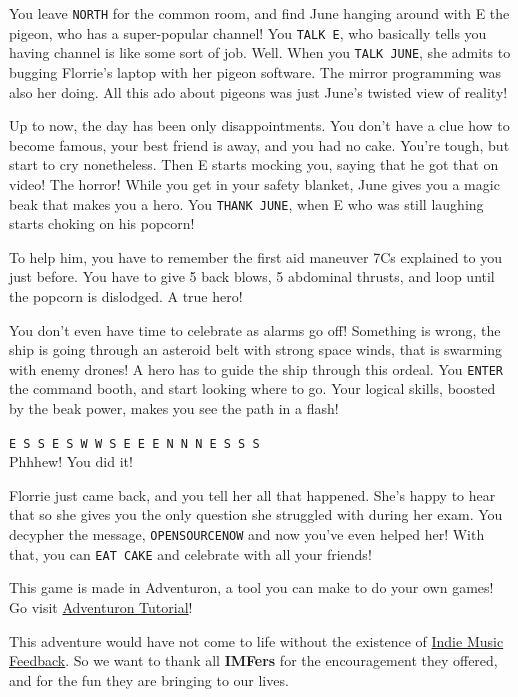 \documentclass{article}
\newcommand{\bbro}[1] {\textbf{\textcolor{darksienna}{#1}}}
\newcommand{\bckg}[1]{\AddToShipoutPictureBG*{\texttt{[image: \#1]}}}
\begin{document}
\clearpage
{}
\bckg{img/bg}

You leave \texttt{NORTH} for the common room,
and find June hanging around with E the pigeon, who has a super-popular channel!
You \texttt{TALK E}, who basically tells you having channel is like some sort of job.
Well. When you \texttt{TALK JUNE}, she admits to bugging Florrie's laptop with her pigeon software.
The mirror programming was also her doing.
All this ado about pigeons was just June's twisted view of reality!

Up to now, the day has been only disappointments.
You don't have a clue how to become famous, your best friend is away, and you had no cake.
You're tough, but start to cry nonetheless.
Then E starts mocking you, saying that he got that on video! The horror!
While you get in your safety blanket, June gives you a magic beak that makes you a hero.
You \texttt{THANK JUNE}, when E who was still laughing starts choking on his popcorn!

To help him, you have to remember the first aid maneuver 7Cs explained to you just before.
You have to give 5 back blows, 5 abdominal thrusts, and loop until the popcorn is dislodged.
A true hero!

You don't even have time to celebrate as alarms go off!
Something is wrong, the ship is going through an asteroid belt with strong space winds,
that is swarming with enemy drones! A hero has to guide the ship through this ordeal.
You \texttt{ENTER} the command booth, and start looking where to go.
Your logical skills, boosted by the beak power, makes you see the path in a flash!

\texttt{E S S E S W W S E E E N N N E S S S} \\
Phhhew! You did it!

Florrie just came back, and you tell her all that happened.
She's happy to hear that so she gives you the only question she struggled with during her exam.
You decypher the message, \texttt{OPENSOURCENOW} and now you've even helped her!
With that, you can \texttt{EAT CAKE} and celebrate with all your friends!

\clearpage

\bckg{img/bg}

This game is made in Adventuron, a tool you can make to do your own games!
Go visit \href{https://adventuron.io/documentation/tutorial-a.html}{Adventuron Tutorial}!

This adventure would have not come to life without the existence of \href{https://indiemusicfeedback.com}{Indie Music Feedback}.
So we want to thank all \bbro{IMFers} for the encouragement they offered, and for the fun they are bringing to our lives.
\end{document}
